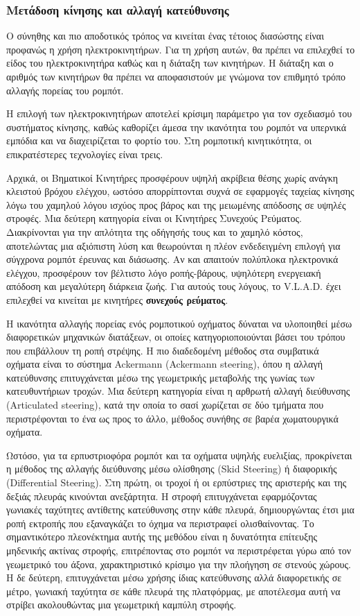 \subsubsection{Μετάδοση κίνησης και αλλαγή κατεύθυνσης}
Ο σύνηθης και πιο αποδοτικός τρόπος να κινείται ένας τέτοιος διασώστης είναι προφανώς η χρήση ηλεκτροκινητήρων. Για τη χρήση αυτών, θα πρέπει να επιλεχθεί το είδος του ηλεκτροκινητήρα καθώς και η διάταξη των κινητήρων. Η διάταξη και ο αριθμός των κινητήρων θα πρέπει να αποφασιστούν με γνώμονα τον επιθμητό τρόπο αλλαγής πορείας του ρομπότ.
\par Η επιλογή των ηλεκτροκινητήρων αποτελεί κρίσιμη παράμετρο για τον σχεδιασμό του συστήματος κίνησης, καθώς καθορίζει άμεσα την ικανότητα του ρομπότ να υπερνικά εμπόδια και να διαχειρίζεται το φορτίο του. Στη ρομποτική κινητικότητα, οι επικρατέστερες τεχνολογίες είναι τρεις.
\par Αρχικά, οι Βηματικοί Κινητήρες προσφέρουν υψηλή ακρίβεια θέσης χωρίς ανάγκη κλειστού βρόχου ελέγχου, ωστόσο απορρίπτονται συχνά σε εφαρμογές ταχείας κίνησης λόγω του χαμηλού λόγου ισχύος προς βάρος και της μειωμένης απόδοσης σε υψηλές στροφές. Μια δεύτερη κατηγορία είναι οι Κινητήρες Συνεχούς Ρεύματος. Διακρίνονται για την απλότητα της οδήγησής τους και το χαμηλό κόστος, αποτελώντας μια αξιόπιστη λύση και θεωρούνται η πλέον ενδεδειγμένη επιλογή για σύγχρονα ρομπότ έρευνας και διάσωσης. Αν και απαιτούν πολύπλοκα ηλεκτρονικά ελέγχου, προσφέρουν τον βέλτιστο λόγο ροπής-βάρους, υψηλότερη ενεργειακή απόδοση και μεγαλύτερη διάρκεια ζωής. Για αυτούς τους λόγους, το V.L.A.D. έχει επιλεχθεί να κινείται με κινητήρες \textbf{συνεχούς ρεύματος}.
\par Η ικανότητα αλλαγής πορείας ενός ρομποτικού οχήματος δύναται να υλοποιηθεί μέσω διαφορετικών μηχανικών διατάξεων, οι οποίες κατηγοριοποιούνται βάσει του τρόπου που επιβάλλουν τη ροπή στρέψης. Η πιο διαδεδομένη μέθοδος στα συμβατικά οχήματα είναι το σύστημα Ackermann (Ackermann steering), όπου η αλλαγή κατεύθυνσης επιτυγχάνεται μέσω της γεωμετρικής μεταβολής της γωνίας των κατευθυντήριων τροχών. Μια δεύτερη κατηγορία είναι η αρθρωτή αλλαγή διεύθυνσης (Articulated steering), κατά την οποία το σασί χωρίζεται σε δύο τμήματα που περιστρέφονται το ένα ως προς το άλλο, μέθοδος συνήθης σε βαρέα χωματουργικά οχήματα.
\par Ωστόσο, για τα ερπυστριοφόρα ρομπότ και τα οχήματα υψηλής ευελιξίας, προκρίνεται η μέθοδος της αλλαγής διεύθυνσης μέσω ολίσθησης (Skid Steering) ή διαφορικής (Differential Steering). Στη πρώτη, οι τροχοί ή οι ερπύστριες της αριστερής και της δεξιάς πλευράς κινούνται ανεξάρτητα. Η στροφή επιτυγχάνεται εφαρμόζοντας γωνιακές ταχύτητες αντίθετης κατεύθυνσης στην κάθε πλευρά, δημιουργώντας έτσι μια ροπή εκτροπής που εξαναγκάζει το όχημα να περιστραφεί ολισθαίνοντας. Το σημαντικότερο πλεονέκτημα αυτής της μεθόδου είναι η δυνατότητα επίτευξης μηδενικής ακτίνας στροφής, επιτρέποντας στο ρομπότ να περιστρέφεται γύρω από τον γεωμετρικό του άξονα, χαρακτηριστικό κρίσιμο για την πλοήγηση σε στενούς χώρους. Η δε δεύτερη, επιτυγχάνεται μέσω χρήσης ίδιας κατεύθυνσης αλλά διαφορετικής σε μέτρο, γωνιακή ταχύτητα σε κάθε πλευρά της πλατφόρμας, με αποτέλεσμα αυτή να στρίβει ακολουθώντας μια γεωμετρική καμπύλη στροφής.
